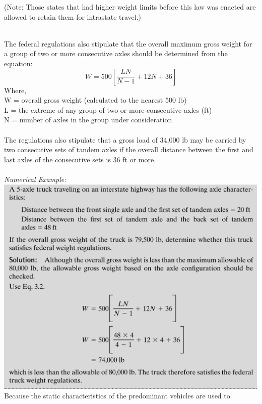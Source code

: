 %
(Note: Those states that had higher weight limits before this law was enacted are allowed to retain them for intrastate travel.)
\\\\
\par
The federal regulations also stipulate that the overall maximum gross weight for a group of two or more consecutive axles should be determined from the equation:
\begin{equation}
	W = 500\left[\frac{LN}{N-1} + 12N + 36\right]
\end{equation}
Where,\\
\hspace*{10mm}W = overall gross weight (calculated to the nearest 500 lb)\\
\hspace*{10mm}L = the extreme of any group of two or more consecutive axles (ft)\\
\hspace*{10mm}N = number of axles in the group under consideration\\\\
%
The regulations also stipulate that a gross load of 34,000 lb may be carried by two consecutive sets of tandem axles if the overall distance between the first and last axles of the consecutive sets is 36 ft or more.
\\\\
\emph{Numerical Example:}
\\
\includegraphics{gfx/fig6.png}
\newpage
Because the static characteristics of the predominant vehicles are used to
